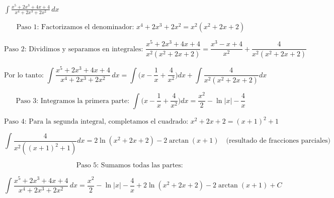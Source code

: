 $
\int \frac{x^{5} + 2x^{3} + 4x + 4}{x^{4} + 2x^{3} + 2x^{2}} \, dx
$

\[
\text{Paso 1: Factorizamos el denominador: } 
x^{4} + 2x^{3} + 2x^{2} = x^{2}(x^{2} + 2x + 2)
\]

\[
\text{Paso 2: Dividimos y separamos en integrales: }
\frac{x^{5}+2x^{3}+4x+4}{x^{2}(x^{2}+2x+2)}
= \frac{x^{3} - x + 4}{x^{2}} + \frac{4}{x^{2}(x^{2}+2x+2)}
\]

\[
\text{Por lo tanto: }
\int \frac{x^{5}+2x^{3}+4x+4}{x^{4}+2x^{3}+2x^{2}} \, dx
= \int \Big(x - \frac{1}{x} + \frac{4}{x^{2}}\Big) dx
+ \int \frac{4}{x^{2}(x^{2}+2x+2)} dx
\]

\[
\text{Paso 3: Integramos la primera parte: }
\int \Big(x - \frac{1}{x} + \frac{4}{x^{2}}\Big) dx
= \frac{x^{2}}{2} - \ln|x| - \frac{4}{x}
\]

\[
\text{Paso 4: Para la segunda integral, completamos el cuadrado: }
x^{2} + 2x + 2 = (x+1)^{2} + 1
\]

\[
\int \frac{4}{x^{2}((x+1)^{2}+1)} dx
= 2\ln(x^{2}+2x+2) - 2\arctan(x+1)
\quad \text{(resultado de fracciones parciales)}
\]

\[
\text{Paso 5: Sumamos todas las partes: }
\]

\[
\boxed{
\int \frac{x^{5} + 2x^{3} + 4x + 4}{x^{4} + 2x^{3} + 2x^{2}} \, dx
= \frac{x^{2}}{2} - \ln|x| - \frac{4}{x} + 2\ln(x^{2}+2x+2) - 2\arctan(x+1) + C
}
\]
